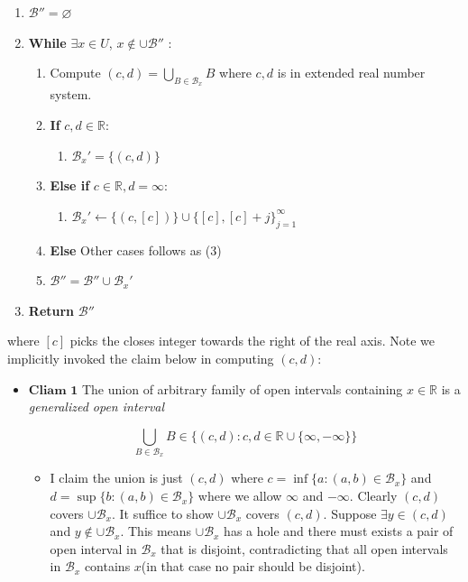 \documentclass[a4paper,11pt,oneside]{book}
\begin{document}
\begin{mystsolution}
\begin{mystprfalgorithm}
\begin{enumerate}
\item $\mathcal B'' = \varnothing$
\item \textbf{While} $\exists x\in U$,  $x\notin \cup \mathcal B''$ :

\begin{enumerate}
\item Compute $(c,d)=\bigcup_{B\in \mathcal B_x} B$ where $c,d$ is in extended real number system.
\item \textbf{If} $c,d\in \mathbb{R}$:

\begin{enumerate}
\item $\mathcal{B}_x'=\{(c,d)\}$
\end{enumerate}


\item \textbf{Else if} $c\in \mathbb{R}, d=\infty$:

\begin{enumerate}
\item $\mathcal{B}_x'\gets \{(c,[c])\}\cup \{[c],[c]+j\}_{j=1}^{\infty}$
\end{enumerate}


\item \textbf{Else}
Other cases follows as (3)
\item $\mathcal B'' = \mathcal B'' \cup \mathcal B_x '$
\end{enumerate}


\item \textbf{Return} $\mathcal B''$
\end{enumerate}

\end{mystprfalgorithm}
where $[c]$ picks the closes integer towards the right of the real axis.
Note we implicitly invoked the claim below in computing $(c,d)$:

\begin{itemize}
\item $\boxed{\textbf{Cliam 1}}$ The union of arbitrary family of open intervals containing $x\in \mathbb{R}$ is a \textit{generalized open interval}

\begin{equation}
\bigcup_{B\in \mathcal B_x} B\in \{(c,d): c,d\in \mathbb{R}\cup \{\infty, -\infty\}\}
\end{equation}

\begin{itemize}
\item I claim the union is just $(c,d)$ where $c=\inf \{a:(a,b)\in \mathcal B_x\}$ and $d=\sup \{b:(a,b)\in \mathcal B_x\}$ where we allow $\infty$ and $-\infty$. Clearly $(c,d)$ covers $\cup \mathcal B_x$. It suffice to show $\cup \mathcal B_x$ covers $(c,d)$. Suppose $\exists y \in (c,d)$ and $y\notin \cup \mathcal B_x$. This means $\cup \mathcal B_x$ has a hole and there must exists a pair of open interval in $\mathcal B_x$ that is disjoint, contradicting that all open intervals in $\mathcal B_x$ contains $x$(in that case no pair should be disjoint).
\end{itemize}
\end{itemize}


\end{mystsolution}
\end{document}
